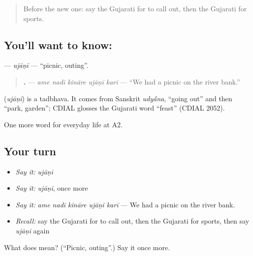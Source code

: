 \begin{quote}
Before the new one: say the Gujarati for to call out, then the Gujarati for sports.
\end{quote}

\subsection*{You'll want to know: }
\textbf{} — \emph{ujāṇī} — \textquotedblleft{}picnic, outing\textquotedblright{}.

\begin{quote}
\textbf{    .} — \emph{ame nadī kināre ujāṇī karī} — \textquotedblleft{}We had a picnic on the river bank.\textquotedblright{}
\end{quote}

\begin{cousinweb}
\textbf{} (\emph{ujāṇī}) is a tadbhava. It comes from Sanskrit \emph{udy\'{\={a}}na}, \textquotedblleft{}going out\textquotedblright{} and then \textquotedblleft{}park, garden\textquotedblright{}; CDIAL glosses the Gujarati word \textquotedblleft{}feast\textquotedblright{} (CDIAL 2052).
\end{cousinweb}

\begin{grammarlens}[title={What you've built}]
One more word for everyday life at A2.
\end{grammarlens}

\subsection*{Your turn}
\begin{itemize}
\raggedright
  \item \emph{Say it:} \emph{ujāṇī}
  \item \emph{Say it:} \emph{ujāṇī}, once more
  \item \emph{Say it:} \emph{ame nadī kināre ujāṇī karī} — We had a picnic on the river bank.
  \item \emph{Recall:} say the Gujarati for to call out, then the Gujarati for sports, then say \emph{ujāṇī} again
\end{itemize}

\begin{tcolorbox}[breakable,colback=teal!4,colframe=teal!35!black,title={Before you move on}]
What does  mean? (\textquotedblleft{}Picnic, outing\textquotedblright{}.) Say it once more.
\end{tcolorbox}
